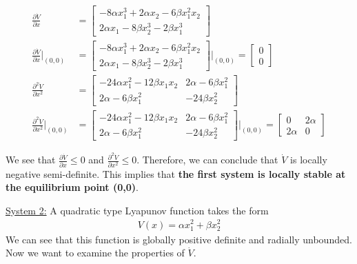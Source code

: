 \documentclass{article}
\begin{document}
  \begin{align*}
    \frac{\partial \dot{V}}{\partial x} &= \begin{bmatrix}
      -8\alpha x_1^3 + 2\alpha x_2 - 6\beta x_1^2x_2 \\
      2\alpha x_1 - 8\beta x_2^3 - 2\beta x_1^3
    \end{bmatrix} \\
    \frac{\partial \dot{V}}{\partial x}\rvert_{(0,0)} &= \begin{bmatrix}
      -8\alpha x_1^3 + 2\alpha x_2 - 6\beta x_1^2x_2 \\
      2\alpha x_1 - 8\beta x_2^3 - 2\beta x_1^3
    \end{bmatrix}\rvert_{(0,0)} = \begin{bmatrix}
      0 \\
      0
    \end{bmatrix} \\
    \frac{\partial^2 \dot{V}}{\partial x^2} &= \begin{bmatrix}
      -24\alpha x_1^2 - 12\beta x_1x_2 & 2\alpha - 6\beta x_1^2 \\
      2\alpha - 6\beta x_1^2 & -24\beta x_2^2
    \end{bmatrix} \\
    \frac{\partial^2 \dot{V}}{\partial x^2}\rvert_{(0,0)} &= \begin{bmatrix}
      -24\alpha x_1^2 - 12\beta x_1x_2 & 2\alpha - 6\beta x_1^2 \\
      2\alpha - 6\beta x_1^2 & -24\beta x_2^2
    \end{bmatrix}\rvert_{(0,0)} =
    \begin{bmatrix}
      0 & 2\alpha \\
      2\alpha & 0
    \end{bmatrix}
  \end{align*}

  We see that $\frac{\partial \dot{V}}{\partial x} \leq 0$ and $\frac{\partial^2
    \dot{V}}{\partial x^2} \leq 0$. Therefore, we can conclude that $\dot{V}$ is
  locally negative semi-definite. \newline \newline
  \indent This implies that \textbf{the first system is locally stable at the
    equilibrium point (0,0)}. \newline \newline
  
  \underline{System 2:} A quadratic type Lyapunov function takes the form
  \begin{align*}
    V(x) = \alpha x_1^2 + \beta x_2^2
  \end{align*}
  We can see that this function is globally positive definite and radially unbounded. Now we want to
  examine the properties of $\dot{V}$.
\end{document}
